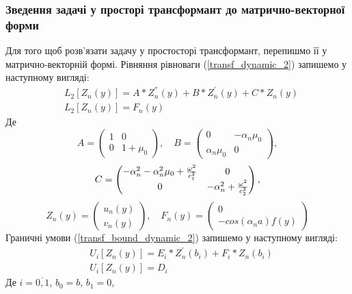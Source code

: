 \subsubsection{Зведення задачі у просторі трансформант до матрично-векторної форми}
Для того щоб розв'язати задачу у простосторі трансформант, перепишмо її у матрично-векторній формі.
Рівняння рівноваги (\ref{transf_dynamic_2}) запишемо у наступному вигляді:
\begin{align}\label{transf_mat_dynamic_2}
    &L_2\left[ Z_n(y) \right] = A * Z_n^{''}(y) + B * Z_n^{'}(y) + C * Z_n(y) \nonumber \\
    &L_2\left[ Z_n(y) \right] = F_n(y)
\end{align}
Де
\begin{equation*}
    A = \begin{pmatrix}
        1 & 0 \\
        0 & 1 + \mu_0
    \end{pmatrix}, \quad
    B = \begin{pmatrix}
        0 & -\alpha_n \mu_0 \\
        \alpha_n \mu_0 & 0
    \end{pmatrix},
\end{equation*}
\begin{equation*}
    \centering
    C = \begin{pmatrix}
        -\alpha_n^2 -\alpha_n^2 \mu_0 + \frac{\omega^2}{c_1^2} & 0 \\
        0 & -\alpha_n^2 + \frac{\omega^2}{c_2^2}
    \end{pmatrix},
\end{equation*}
\begin{equation*}
    Z_n(y) = \begin{pmatrix}
        u_n(y) \\
        v_n(y)
    \end{pmatrix}, \quad 
    F_n(y) = \begin{pmatrix}
        0 \\
        - cos(\alpha_n a) f(y)
    \end{pmatrix}
\end{equation*}
Граничні умови (\ref{transf_bound_dynamic_2}) запишемо у наступному вигляді:
\begin{align}\label{transf_bound_mat_dynamic_2}
    &U_i\left[ Z_n(y) \right] = E_i * Z_n^{'}(b_i) + F_i * Z_n(b_i) \nonumber \\
    & U_i\left[ Z_n(y) \right] = D_i
\end{align}
Де $i = \overline{0, 1}$, $b_0 = b$, $b_1 = 0$,
